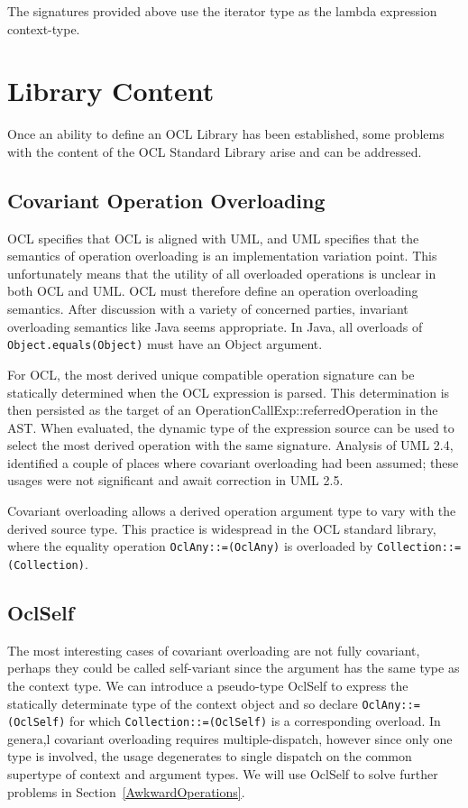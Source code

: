 \documentclass{eceasst}
\begin{document}
The signatures provided above use the iterator type as the lambda expression context-type.

\section{Library Content}\label{LibraryContent}

Once an ability to define an OCL Library has been established, some problems with the content of the OCL Standard Library arise and can be addressed. 

\subsection{Covariant Operation Overloading}

OCL specifies that OCL is aligned with UML, and UML specifies that the semantics of operation overloading is an implementation variation point. This unfortunately means that the utility of all overloaded operations is unclear in both OCL and UML. OCL must therefore define an operation overloading semantics. After discussion with a variety of concerned parties, invariant overloading semantics like Java seems appropriate. In Java, all overloads of \verb|Object.equals(Object)| must have an Object argument.

For OCL, the most derived unique compatible operation signature can be statically determined when the OCL expression is parsed. This determination is then persisted as the target of an OperationCallExp::referredOperation in the AST. When evaluated, the dynamic type of the expression source can be used to select the most derived operation with the same signature. Analysis of UML 2.4, identified a couple of places where covariant overloading had been assumed; these usages were not significant and await correction in UML 2.5.

Covariant overloading allows a derived operation argument type to vary with the derived source type. This practice is widespread in the OCL standard library, where the equality operation \verb|OclAny::=(OclAny)| is overloaded by \verb|Collection::=(Collection)|.

\subsection{OclSelf}

The most interesting cases of covariant overloading are not fully covariant, perhaps they could be called self-variant since the argument has the same type as the context type. We can introduce a pseudo-type OclSelf to express the statically determinate type of the context object and so declare \verb|OclAny::=(OclSelf)| for which \verb|Collection::=(OclSelf)| is a corresponding overload. In genera,l covariant overloading requires multiple-dispatch\cite{Overload}, however since only one type is involved, the usage degenerates to single dispatch on the common supertype of context and argument types. We will use OclSelf to solve further problems in Section~\ref{AwkwardOperations}.
\end{document}
